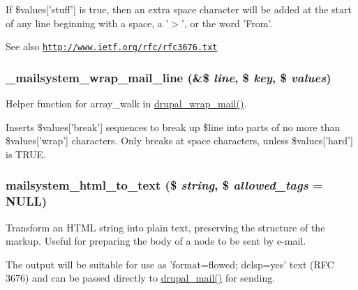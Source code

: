 If \$values\mbox{[}'stuff'\mbox{]} is true, then an extra space character will be added at the start of any line beginning with a space, a '$>$', or the word 'From'.

\begin{DoxySeeAlso}{See also}
\href{http://www.ietf.org/rfc/rfc3676.txt}{\tt http://www.ietf.org/rfc/rfc3676.txt} 
\end{DoxySeeAlso}
\hypertarget{html__to__text_8inc_af062b4bc2cb10c61afac44647167bd19}{
\subsubsection[{\_\-mailsystem\_\-wrap\_\-mail\_\-line}]{\setlength{\rightskip}{0pt plus 5cm}\_\-mailsystem\_\-wrap\_\-mail\_\-line (\&\$ {\em line}, \/  \$ {\em key}, \/  \$ {\em values})}}
\label{html__to__text_8inc_af062b4bc2cb10c61afac44647167bd19}
Helper function for array\_\-walk in \hyperlink{mail_8inc_a955ffecc70c15ab89079ea29557f7b41}{drupal\_\-wrap\_\-mail()}.

Inserts \$values\mbox{[}'break'\mbox{]} sequences to break up \$line into parts of no more than \$values\mbox{[}'wrap'\mbox{]} characters. Only breaks at space characters, unless \$values\mbox{[}'hard'\mbox{]} is TRUE. \hypertarget{html__to__text_8inc_abd38fa306fb704f7e880c034042768b2}{
\subsubsection[{mailsystem\_\-html\_\-to\_\-text}]{\setlength{\rightskip}{0pt plus 5cm}mailsystem\_\-html\_\-to\_\-text (\$ {\em string}, \/  \$ {\em allowed\_\-tags} = {\ttfamily NULL})}}
\label{html__to__text_8inc_abd38fa306fb704f7e880c034042768b2}
Transform an HTML string into plain text, preserving the structure of the markup. Useful for preparing the body of a node to be sent by e-\/mail.

The output will be suitable for use as 'format=flowed; delsp=yes' text (RFC 3676) and can be passed directly to \hyperlink{mail_8inc_ab80781fd7273975a77cbbd13300eddbf}{drupal\_\-mail()} for sending.

